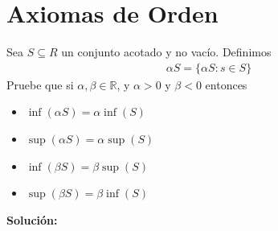 \documentclass[12pt]{book}
\begin{document}
\chapter{Axiomas de Orden}

\begin{prob}{}{}
    Sea $S \subseteq R$ un conjunto acotado y no vacío. Definimos 
\begin{align*}
    \alpha S=\{\alpha S : s \in S \}
\end{align*}
Pruebe que si $\alpha, \beta \in \mathbb
R$, y $\alpha>0$ y $\beta <0$ entonces
\begin{itemize}
    \item[\textbf{a)}] $\inf(\alpha S)=\alpha\inf(S)$ 
    \item[\textbf{b)}]  $\sup(\alpha S)=\alpha\sup(S)$
    \item[\textbf{c)}] $\inf(\beta S )=\beta \sup(S)$
    \item[\textbf{d)}] $\sup(\beta S)=\beta\inf(S)$
\end{itemize}
\end{prob}
\textbf{Solución:}
\end{document}
